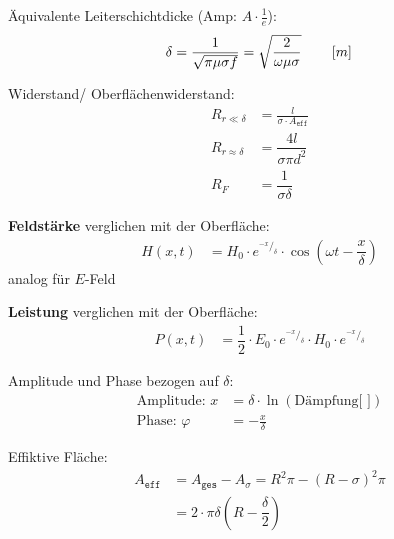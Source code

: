 \begin{description}
    \item Äquivalente Leiterschichtdicke (Amp: $A \cdot \frac{1}{e}$):
        \[
            \delta = \frac{1}{\sqrt{\pi\mu\sigma f}} = \sqrt{\frac{2}{\omega\mu\sigma}} \qquad \left[ m \right] \\
        \]

    \item Widerstand/ Oberflächenwiderstand:
          \begin{align*}
              R_{r\ll\delta}     & = \frac{l}{\sigma \cdot A_{\texttt{eff}}} \\
              R_{r\approx\delta} & =\dfrac{4l}{\sigma \pi d^{2}}             \\
              R_F                & = \dfrac{1}{\sigma \delta}
          \end{align*}

    \item \textbf{Feldstärke} verglichen mit der Oberfläche:
          \begin{align*}
              H\left( x,t\right) & =H_{0}\cdot e^{^{-x}/_\delta}\cdot \cos \left( \omega t-\dfrac{x}{\delta}\right)
          \end{align*}
          analog für $E$-Feld

    \item \textbf{Leistung} verglichen mit der Oberfläche:
          \begin{align*}
              P\left( x,t\right) & =\dfrac{1}{2} \cdot E_{0}\cdot e^{^{-x}/_\delta}\cdot H_{0}\cdot e^{^{-x}/_\delta}
          \end{align*}

    \item Amplitude und Phase bezogen auf $\delta$:
          \begin{align*}
              \text{Amplitude: } x   & =\delta \cdot \ln(\text{Dämpfung[ ]}) \\
              \text{Phase: } \varphi & = -\frac{x}{\delta}
          \end{align*}

    \item Effiktive Fläche:
          \begin{align*}
              A_{\texttt{eff}} & = A_{\texttt{ges}} - A_{\sigma} = R^2\pi-(R-\sigma)^2\pi \\
                               & =2\cdot \pi \delta \left( R-\dfrac{\delta }{2}\right)
          \end{align*}
\end{description}

